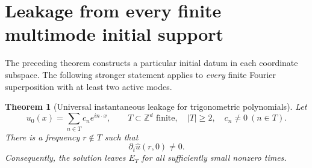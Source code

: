 \documentclass[11pt]{amsart}
\newtheorem{theorem}{Theorem}
\newcommand{\Z}{\mathbb Z}
\begin{document}
\section{Leakage from every finite multimode initial support}

The preceding theorem constructs a particular initial datum in each
coordinate subspace.  The following stronger statement applies to
\emph{every} finite Fourier superposition with at least two active modes.

\begin{theorem}[Universal instantaneous leakage for trigonometric polynomials]
\label{thm:all-data}
Let
\begin{equation}\label{eq:general-u}
 u_0(x)=\sum_{n\in T}c_n e^{in\cdot x},
 \qquad T\subset\Z^d\text{ finite},\quad |T|\ge2,
 \quad c_n\ne0\ (n\in T).
\end{equation}
There is a frequency $r\notin T$ such that
\[
 \partial_t\widehat u(r,0)\ne0.
\]
Consequently, the solution leaves $E_T$ for all sufficiently small
nonzero times.
\end{theorem}
\end{document}
